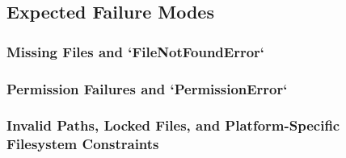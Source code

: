 \subsection{Expected Failure Modes}
\subsubsection{Missing Files and `FileNotFoundError`}
\subsubsection{Permission Failures and `PermissionError`}
\subsubsection{Invalid Paths, Locked Files, and Platform-Specific Filesystem Constraints}
